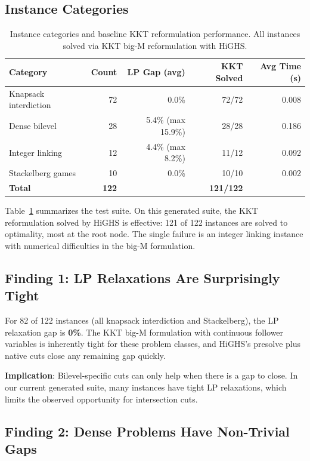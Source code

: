 \documentclass[11pt]{article}
\begin{document}
\subsection{Instance Categories}

\begin{table}[t]
\centering
\caption{Instance categories and baseline KKT reformulation performance.
All instances solved via KKT big-M reformulation with HiGHS.}
\label{tab:instances}
\begin{tabular}{lrrrr}
\toprule
Category & Count & LP Gap (avg) & KKT Solved & Avg Time (s) \\
\midrule
Knapsack interdiction & 72 & 0.0\% & 72/72 & 0.008 \\
Dense bilevel & 28 & 5.4\% (max 15.9\%) & 28/28 & 0.186 \\
Integer linking & 12 & 4.4\% (max 8.2\%) & 11/12 & 0.092 \\
Stackelberg games & 10 & 0.0\% & 10/10 & 0.002 \\
\midrule
\textbf{Total} & \textbf{122} & & \textbf{121/122} & \\
\bottomrule
\end{tabular}
\end{table}

Table~\ref{tab:instances} summarizes the test suite. On this generated suite,
the KKT reformulation solved by HiGHS is effective: 121 of 122 instances are
solved to optimality, most at the root node. The single failure is an integer
linking instance with numerical difficulties in the big-M formulation.

\subsection{Finding 1: LP Relaxations Are Surprisingly Tight}

For 82 of 122 instances (all knapsack interdiction and Stackelberg), the
LP relaxation gap is \textbf{0\%}. The KKT big-M formulation with continuous
follower variables is inherently tight for these problem classes, and
HiGHS's presolve plus native cuts close any remaining gap quickly.

\textbf{Implication}: Bilevel-specific cuts can only help when there is a
gap to close. In our current generated suite, many instances have tight LP
relaxations, which limits the observed opportunity for intersection cuts.

\subsection{Finding 2: Dense Problems Have Non-Trivial Gaps}
\end{document}
